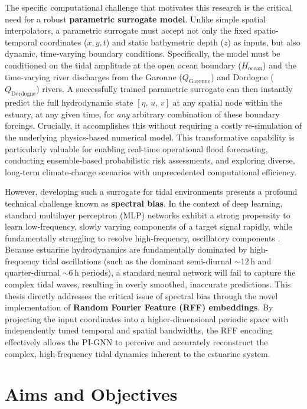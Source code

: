The specific computational challenge that motivates this research is the critical need for
a robust \textbf{parametric surrogate model}. Unlike simple spatial interpolators, a parametric surrogate must accept not only the fixed
spatio-temporal coordinates ($x, y, t$) and static bathymetric depth ($z$) as inputs, but also dynamic, time-varying boundary conditions. Specifically, the model must be conditioned on the
tidal amplitude at the open ocean boundary ($H_\mathrm{ocean}$) and the time-varying
river discharges from the Garonne ($Q_\mathrm{Garonne}$) and Dordogne
($Q_\mathrm{Dordogne}$) rivers. A successfully trained parametric
surrogate can then instantly predict the full hydrodynamic state
$[\eta,\, u,\, v]$ at any spatial node within the estuary, at any given time, for \emph{any} arbitrary
combination of these boundary forcings. Crucially, it accomplishes this without requiring a costly re-simulation of the underlying physics-based numerical model. This transformative capability is
particularly valuable for enabling real-time operational flood forecasting, conducting ensemble-based
probabilistic risk assessments, and exploring diverse, long-term climate-change scenarios with unprecedented computational efficiency.

However, developing such a surrogate for tidal environments presents a profound technical challenge known as
\textbf{spectral bias}. In the context of deep learning, standard multilayer perceptron (MLP) networks
exhibit a strong propensity to learn low-frequency, slowly varying components of a target signal rapidly, while fundamentally
struggling to resolve high-frequency, oscillatory components \cite{Tancik2020}. Because estuarine hydrodynamics are fundamentally dominated by high-frequency tidal oscillations (such as the dominant semi-diurnal $\sim$12\,h and quarter-diurnal $\sim$6\,h periods), a standard neural network will fail to capture the complex tidal waves, resulting in overly smoothed, inaccurate predictions. This thesis directly addresses the critical issue of spectral bias
through the novel implementation of \textbf{Random Fourier Feature (RFF) embeddings}. By projecting the input coordinates into a higher-dimensional periodic space with
independently tuned temporal and spatial bandwidths, the RFF encoding effectively allows the PI-GNN to perceive and accurately reconstruct the complex, high-frequency tidal dynamics inherent to the estuarine system.

\section{Aims and Objectives}

